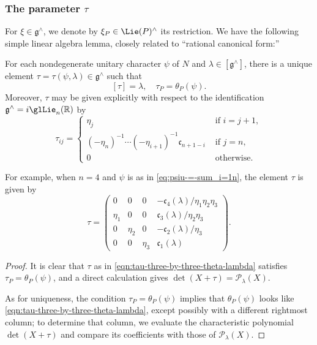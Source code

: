 \subsubsection{The parameter $\tau$}\label{sec:parameter-tau}
For $\xi \in \mathfrak{g}^\wedge$, we denote by $\xi_P \in \Lie(P)^\wedge$ its restriction.  We have the following simple linear algebra lemma, closely related to ``rational canonical form:''
\begin{lemma}\label{lem:construction-tau-from-theta}
  For each nondegenerate unitary character $\psi$ of $N$ and $\lambda \in [\mathfrak{g}^\wedge]$, there is a unique element $\tau = \tau(\psi,\lambda) \in \mathfrak{g}^\wedge$ such that 
  \[
    [\tau] = \lambda, \quad \tau_P = \theta_P(\psi).
  \]
  Moreover, $\tau$ may be given explicitly with respect to the identification $\mathfrak{g}^\wedge = i \glLie_n(\mathbb{R})$ by
  \[
    \tau_{i j} =
    \begin{cases}
      \eta_j   & \text{ if } i = j+1, \\
      (-\eta_n)^{-1} \dotsb (-\eta_{i+1})^{-1} \mathfrak{c}_{n+1-i}
            & \text{ if } j = n, \\
      0 & \text{ otherwise}.
    \end{cases}
  \]
\end{lemma}
For example, when $n=4$ and $\psi$ is as in \eqref{eq:psiu-=-sum_i=1n}, the element $\tau$ is given by
\begin{equation}\label{eqn:tau-three-by-three-theta-lambda}
  \tau
  =
  \begin{pmatrix}
    0 & 0 & 0 &  - \mathfrak{c}_4(\lambda)  / \eta_1 \eta_2 \eta_3 \\
    \eta_1  & 0 & 0 & \mathfrak{c}_3(\lambda)  / \eta_2 \eta_3\\
    0 & \eta_2 & 0 & -\mathfrak{c}_2(\lambda)/ \eta_3 \\
    0 & 0 & \eta_3 & \mathfrak{c}_1(\lambda)
  \end{pmatrix}.
\end{equation}
\begin{proof}
  It is clear that $\tau$ as in \eqref{eqn:tau-three-by-three-theta-lambda} satisfies $\tau_P = \theta_P(\psi)$, and a direct calculation gives $\det(X + \tau) = \mathcal{P}_\lambda(X)$.

  As for uniqueness, the condition $\tau_P = \theta_P(\psi)$ implies that $\theta_P(\psi)$ looks like \eqref{eqn:tau-three-by-three-theta-lambda}, except possibly with a different rightmost column; to determine that column, we evaluate the characteristic polynomial $\det(X + \tau)$ and compare its coefficients with those of $\mathcal{P}_\lambda(X)$.
\end{proof}



